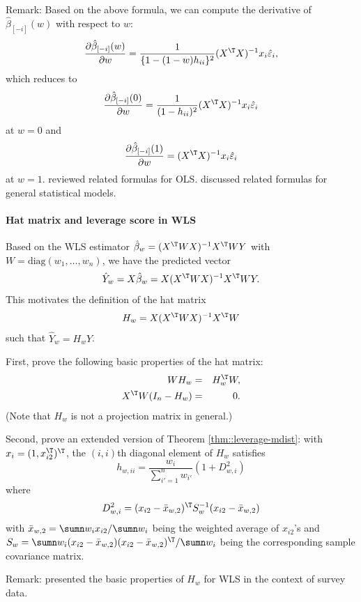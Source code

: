 Remark: 
Based on the above formula, we can compute the derivative of $\hat{\beta}_{[-i]}(w) $ with respect to $w$:
$$
\frac{ \partial  \hat{\beta}_{[-i]}(w)  }{  \partial  w } = \frac{1}{\{ 1-(1-w)h_{ii} \}^2} (X^{\T} X)^{-1} x_i \hat{\varepsilon}_i,
$$
which reduces to 
$$
\frac{ \partial  \hat{\beta}_{[-i]}(0)  }{  \partial  w } = \frac{1}{( 1-h_{ii} )^2} (X^{\T} X)^{-1} x_i \hat{\varepsilon}_i
$$
at $w=0$ and 
$$
\frac{ \partial  \hat{\beta}_{[-i]}(1)  }{  \partial  w } =  (X^{\T} X)^{-1} x_i \hat{\varepsilon}_i
$$
at $w=1$. 
\citet{pregibon1981logistic} reviewed related formulas for OLS.
\citet{broderick2020automatic} discussed related formulas for general statistical models. 




 
 \paragraph{Hat matrix and leverage score in WLS}
 \label{hw16::hat-matrix-leverage-scores}
 
 
 Based on the WLS estimator $\hat{\beta}_w = (X^{\T}  W X)^{-1} X^{\T} W Y $ with $W = \text{diag}(w_1, \ldots, w_n)$, we have the predicted vector 
 $$
 \hat{Y}_w = X \hat{\beta}_w  =  X (X^{\T}  W X)^{-1} X^{\T} W Y.
 $$
 This motivates the definition of the hat matrix 
 $$
H_w =   X (X^{\T}WX)^{-1} X^{\T}W 
$$
 such that $ \hat{Y}_w = H_w Y$. 
 
First, prove the following basic properties of the hat matrix:
\begin{eqnarray*}
WH_w &=& H_w^{\T} W,\\ 
X^{\T} W (I_n - H_w) &=& 0.
\end{eqnarray*}
(Note that $H_w$ is not a projection matrix in general.)

Second, prove an extended version of Theorem \ref{thm::leverage-mdist}: with $x_i = (1,x_{i2}^{\T} )^{\T} $, the $(i,i)$th diagonal element of $H_w$ satisfies
$$
h_{w,ii} = \frac{w_i}{  \sum_{i'=1}^n w_{i'} }  (1 + D_{w,i}^2)
$$ 
where 
$$
D_{w,i}^2 =   (x_{i2} - \bar{x}_{w,2})^{\T} S_w^{-1}  (x_{i2} - \bar{x}_{w,2})
$$
with $\bar{x}_{w,2} = \sumn  w_i x_{i2}  / \sumn  w_i $ being the weighted average of $x_{i2}$'s and  $S_w   =   \sumn w_i (x_{i2} - \bar{x}_{w,2})(x_{i2} - \bar{x}_{w,2})^{\T} / \sumn w_i  $ being the corresponding sample covariance matrix. 
 
 



 
 Remark: 
\citet{li2009survey} presented the basic properties of $H_w$ for WLS in the context of survey data. 




